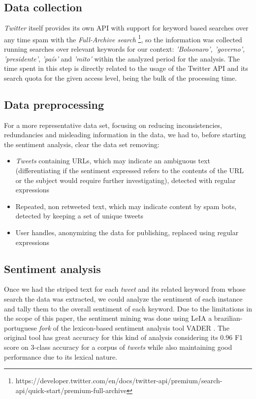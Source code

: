 \documentclass[conference]{IEEEtran}
\begin{document}
\subsection{Data collection}
\label{sec:org1c6969f}
\emph{Twitter} itself provides its own API with support for keyword based searches over any time spam with the \emph{Full-Archive search} \footnote{https://developer.twitter.com/en/docs/twitter-api/premium/search-api/quick-start/premium-full-archive},  so the information was collected running searches over relevant keywords for our context: \emph{'Bolsonaro', 'governo', 'presidente'}, \emph{'país'} and \emph{'mito'} within the analyzed period for the analysis. The time spent in this step is directly related to the usage of the Twitter API and its search quota for the given access level, being the bulk of the processing time.
\subsection{Data preprocessing}
\label{sec:org65554cd}
For a more representative data set, focusing on reducing inconsistencies, redundancies and misleading information in the data, we had to, before starting the sentiment analysis, clear the data set removing:
\begin{itemize}
\item \emph{Tweets} containing URLs, which may indicate an ambiguous text (differentiating if the sentiment expressed refers to the contents of the URL or the subject would require further investigating), detected with regular expressions
\item Repeated, non retweeted text, which may indicate content by spam bots, detected by keeping a set of unique tweets
\item User handles, anonymizing the data for publishing, replaced using regular expressions
\end{itemize}
\subsection{Sentiment analysis}
\label{sec:orge137b4a}
Once we had the striped text for each \emph{tweet} and its related keyword from whose search the data was extracted, we could analyze the sentiment of each instance and tally them to the overall sentiment of each keyword. Due to the limitations in the scope of this paper, the sentiment mining was done using LeIA \cite{Almeida2018} a brazilian-portuguese \emph{fork} of the lexicon-based sentiment analysis tool VADER \cite{Hutto2014}. The original tool has great accuracy for this kind of analysis considering its 0.96 F1 score on 3-class accuracy for a corpus of \emph{tweets} while also maintaining good performance due to its lexical nature.
\end{document}
